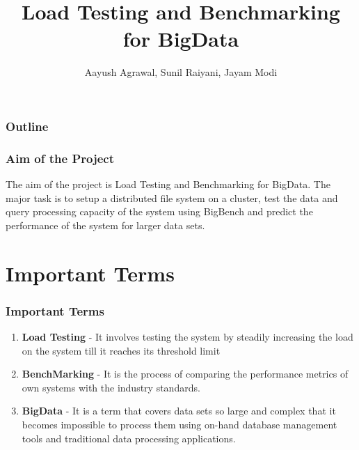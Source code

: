 \documentclass[12pt,xcolor=dvipsnames]{beamer}
\title{Load Testing and Benchmarking for BigData}
\author{Aayush Agrawal, Sunil Raiyani, Jayam Modi}
\begin{document}
 


\begin{frame}
\titlepage
\end{frame}


\begin{frame}
\frametitle{Outline}
\begin{multicols}{2}
\tableofcontents[hideallsubsections]
\end{multicols}
\end{frame}


\begin{frame}[t]
\frametitle{Aim of the Project}
The aim of the project is Load Testing and Benchmarking for BigData. 
\newline
\newline
The major task is to setup a distributed file system on a cluster, test the data and query processing capacity 
of the system using BigBench and predict the performance of the system for larger data sets.
\end{frame}


\section{Important Terms}
\begin{frame}[t]
\frametitle{Important Terms}

\begin{enumerate}
 \item \textbf{Load Testing} -  It involves testing the system by steadily increasing the load on the system till it reaches
its threshold limit
 \item \textbf{BenchMarking} - It is the process of comparing the performance metrics of own systems with the industry 
 standards.
 \item \textbf{BigData} - It is a term that covers data sets so large and complex that it becomes impossible to process them using
 on-hand database management tools and traditional data processing applications.
\end{enumerate}


\end{frame}
\end{document}

